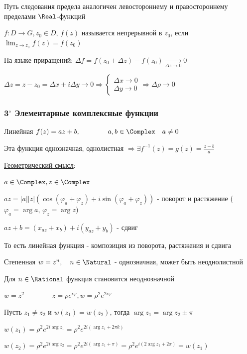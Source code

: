 \Nota Путь следования предела аналогичен левостороннему и правостороннему пределами $\Real$-функций


$f : D \longrightarrow G, z_0 \in D$, $f(z)$ называется непрерывной в $z_0$, если $\lim_{z \to z_0} f(z) = f(z_0)$

На языке приращений: $\Delta f = f(z_0 + \Delta z) - f(z_0) \underset{\Delta z \to 0}{\longrightarrow} 0$

$\Delta z = z - z_0 = \Delta x + i \Delta y \to 0 \Longrightarrow 
\begin{cases}\Delta x \to 0 \\ \Delta y \to 0\end{cases} \Longrightarrow 
\Delta \rho \to 0$

\subsubsection{3$^\circ$ Элементарные комплексные функции}

 Линейная $f(z) = az + b, \qquad\qquad a, b \in \Complex \quad a \neq 0$

Эта функция однозначная, однолистная $\Longrightarrow \exists f^{-1}(z) = g(z) = \frac{z - b}{a}$

\underline{Геометрический смысл}:

$a \in \Complex, z \in \Complex$

$az = |a| |z| (\cos (\varphi_a + \varphi_z) + i \sin (\varphi_a + \varphi_z))$ - поворот и растяжение 
($\varphi_a = \arg a$, $\varphi_z = \arg z$)

$az + b = (x_{az} + x_b) + i (y_{az} + y_b)$ - сдвиг

То есть линейная функция - композиция из поворота, растяжения и сдвига

 Степенная $w = z^n, \quad n \in \Natural$ - однозначная, может быть неоднолистной

Для $n \in \Rational$ функция становится неоднозначной

\Exs $w = z^2 \qquad\qquad z = \rho e^{i\varphi}, w = \rho^2 e^{2i\varphi}$

Пусть $z_1 \neq z_2$ и $w(z_1) = w(z_2)$, тогда $\arg z_1 = \arg z_2 \pm \pi$ 

$w(z_1) = \rho^2 e^{2i\arg z_1} = \rho^2 e^{2i (\arg z_1 + 2\pi k)}$

$w(z_2) = \rho^2 e^{2i\arg z_2} = \rho^2 e^{2i (\arg z_1 + \pi)} = \rho^2 e^{i (2\arg z_1 + 2\pi)} = w(z_1)$


